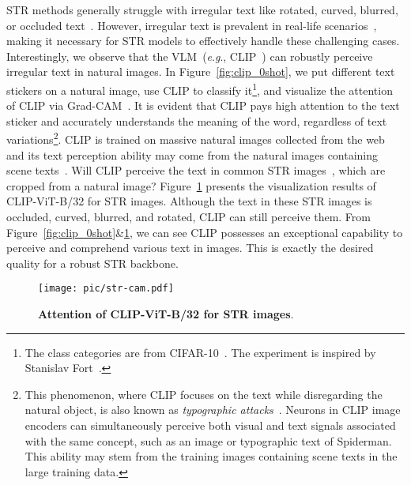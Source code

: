 \documentclass[lettersize,journal]{IEEEtran}
\newcommand{\eg}{\textit{e}.\textit{g}.}
\begin{document}
STR methods generally struggle with irregular text like rotated, curved, blurred, or occluded text~\cite{2021_long_survey,2022_chen_survey}.
However, irregular text is prevalent in real-life scenarios~\cite{2019_icdar_art,zhang2017uber},
making it necessary for STR models to effectively handle these challenging cases.
Interestingly, we observe that the VLM~(\eg, CLIP~\cite{2021-clip}) can robustly perceive irregular text in natural images.
In Figure~\ref{fig:clip_0shot}, we put different text 
stickers on a natural image, use CLIP to classify it\footnote{The class categories are from CIFAR-10~\cite{krizhevsky2009learning}.
The experiment is inspired by Stanislav Fort~\cite{Fort2021CLIPadversarialstickers}.
}, and visualize the attention
of CLIP via Grad-CAM~\cite{2020_ijcv_gradcam}.
It is evident that CLIP pays high attention to the text sticker and accurately understands the meaning of the word, regardless of text variations\footnote{This phenomenon, where CLIP focuses on the text while disregarding the natural object, is also known as \textit{typographic attacks}~\cite{goh2021multimodal}.
Neurons in CLIP image encoders can simultaneously perceive both visual and text signals associated with the same concept, such as an image or typographic text of Spiderman. This ability may stem from the training images containing scene texts in the large training data.
}.
CLIP is trained on massive natural images collected from the web and its text perception ability may come from the natural images containing scene texts~\cite{goh2021multimodal}.
Will CLIP perceive the text in common STR images~\cite{2013_ic13,2015_karatzas_ic15,zhang2017uber}, which are cropped from a natural image?
Figure~\ref{fig:str-cam} presents the visualization results of CLIP-ViT-B/32 for STR images.
Although the text in these STR images is occluded, curved, blurred, and rotated, CLIP can still perceive them.
From Figure~\ref{fig:clip_0shot}\&\ref{fig:str-cam}, we can see CLIP possesses an exceptional capability to perceive and comprehend various text in images.
This is exactly the desired quality for a robust STR backbone.

\begin{figure}[!t]
	\centering
	\texttt{[image: pic/str-cam.pdf]}
	\caption{\textbf{Attention of CLIP-ViT-B/32 for STR images}.}
	\label{fig:str-cam}
\end{figure}
\end{document}
